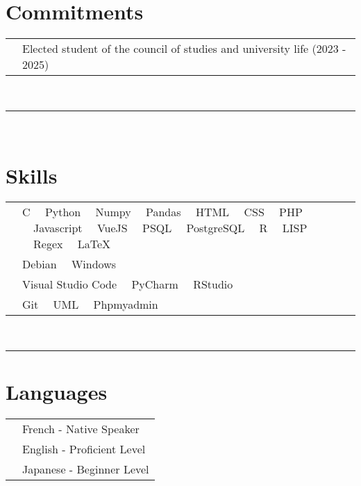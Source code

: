\documentclass[oneside]{article}
\begin{document}
{\begin{minipage}[t][\textheight-2\fboxsep-2\fboxrule][t]{\dimexpr0.40\textwidth-2\fboxrule-2\fboxsep\relax}
        \section*{\large Commitments}
        \begin{tabularx}{\textwidth}{cY}
            & Elected student of the council of studies and university life (2023 - 2025)
        \end{tabularx}
        \vspace{7pt} \\
        \rule{\linewidth}{0.4pt} \\
        \section*{\large Skills}
        \begin{tabularx}{\textwidth}{cY}
            \faCode{}        & C \ \ Python \ \ Numpy \ \ Pandas \ \ HTML \ \ CSS \ \ PHP \ \ Javascript \ \ VueJS \ \ PSQL \ \ PostgreSQL \ \ R \ \ LISP \ \ Regex \ \ LaTeX \\
            \faCogs{}        & Debian \ \ Windows \\
            \faLaptopCode{}  & Visual Studio Code \ \ PyCharm \ \ RStudio \\
            \faToolbox{}     & Git \ \ UML \ \ Phpmyadmin
        \end{tabularx}
        \vspace{1pt} \\
        \rule{\linewidth}{0.4pt}
        
        \section*{\large Languages}
        \begin{tabularx}{\textwidth}{cY}
            \faLanguage{} & French - Native Speaker \\
            \faLanguage{} & English - Proficient Level \\
            \faLanguage{} & Japanese - Beginner Level \\
        \end{tabularx}
        \vspace{.3cm}
        \\
        

\end{minipage}}
\end{document}
